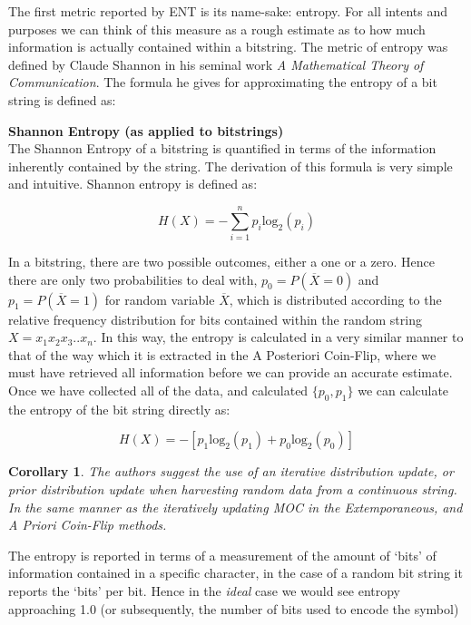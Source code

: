 \documentclass{IEEEtran}
\newtheorem{corollary}[theorem]{Corollary}
\newenvironment{definition}[1][Definition]{\begin{trivlist}
\item[\hskip \labelsep {\bfseries #1}]}{\end{trivlist}}
\begin{document}
The first metric reported by ENT is its name-sake: entropy. For all intents and purposes we can think of this measure as a rough estimate as to how much information is actually contained within a bitstring. The metric of entropy was defined by Claude Shannon in his seminal work \textit{A Mathematical Theory of Communication}. The formula he gives for approximating the entropy of a bit string is defined as: 

\begin{definition}
\textbf{Shannon Entropy (as applied to bitstrings)} \\
The Shannon Entropy of a bitstring is quantified in terms of the information inherently contained by the string. The derivation of this formula is very simple and intuitive. Shannon entropy is defined as: 

$$H(X) = -\sum_{i=1}^n{p_i \textrm{log}_2(p_i)} $$

In a bitstring, there are two possible outcomes, either a one or a zero. Hence there are only two probabilities to deal with, $p_0 = P(\overline{X} = 0)$ and $p_1 = P(\overline{X} = 1)$ for random variable $\overline{X}$, which is distributed according to the relative frequency distribution for bits contained within the random string $X = x_1x_2x_3..x_n$. In this way, the entropy is calculated in a very similar manner to that of the way which it is extracted in the A Posteriori Coin-Flip, where we must have retrieved all information before we can provide an accurate estimate. Once we have collected all of the data, and calculated $\{p_0,p_1\}$ we can calculate the entropy of the bit string directly as: 

$$H(X) = -[p_1\textrm{log}_2(p_1) + p_0\textrm{log}_2(p_0)]$$
\end{definition}

\begin{corollary}
The authors suggest the use of an iterative distribution update, or prior distribution update when harvesting random data from a continuous string. In the same manner as the iteratively updating MOC in the Extemporaneous, and A Priori Coin-Flip methods. 
\end{corollary}

The entropy is reported in terms of a measurement of the amount of `bits' of information contained in a specific character, in the case of a random bit string it reports the `bits' per bit. Hence in the \textit{ideal} case we would see entropy approaching 1.0 (or subsequently, the number of bits used to encode the symbol)
\end{document}

